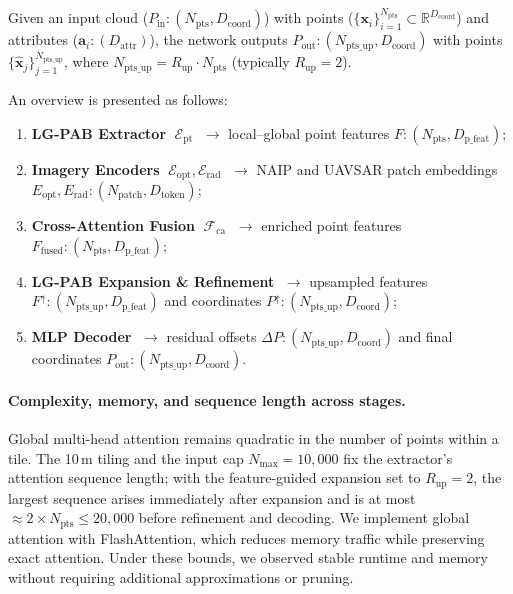 \documentclass[remotesensing,article,accept,pdftex,moreauthors]{Definitions/mdpi}
\begin{document}
Given an input cloud ($P_{\text{in}}: (N_{\text{pts}}, D_{\text{coord}})$) with points
 ($\{\mathbf{{x}}_i\}_{i=1}^{N_{\text{pts}}}\subset\mathbb{R}^{D_{\text{coord}}}$) and attributes ($\mathbf{a}_i: (D_{\text{attr}})$), the network outputs $P_{\text{out}}: (N_{\text{pts\_up}}, D_{\text{coord}})$ with points $\{\hat{\mathbf{x}}_j\}_{j=1}^{N_{\text{pts\_up}}}$, where $N_{\text{pts\_up}} = R_{\text{up}} \cdot N_{\text{pts}}$ (typically $R_{\text{up}} = 2$).

An overview is presented as follows:

\begin{enumerate}[leftmargin=*]
\item \textbf{LG-PAB Extractor
} $\;\mathcal{E}_{\mathrm{pt}}$
      $\;\rightarrow$ local–global point features $F: (N_{\text{pts}}, D_{\text{p\_feat}})$;
\item \textbf{Imagery Encoders} $\;\mathcal{E}_{\mathrm{opt}},\mathcal{E}_{\mathrm{rad}}$
      $\;\rightarrow$ NAIP and UAVSAR patch embeddings $E_{\text{opt}}, E_{\text{rad}}: (N_{\text{patch}}, D_{\text{token}})$;
\item \textbf{Cross-Attention Fusion} $\;\mathcal{F}_{\mathrm{ca}}$
      $\;\rightarrow$ enriched point features $F_{\!\mathrm{fused}}: (N_{\text{pts}}, D_{\text{p\_feat}})$;
\item \textbf{LG-PAB Expansion \& Refinement}
      $\;\rightarrow$ upsampled features $F^{\uparrow}: (N_{\text{pts\_up}}, D_{\text{p\_feat}})$ and coordinates $P^{\uparrow}: (N_{\text{pts\_up}}, D_{\text{coord}})$;
\item \textbf{MLP Decoder} $\;\rightarrow$ residual offsets $\Delta P: (N_{\text{pts\_up}}, D_{\text{coord}})$ and final coordinates $P_{\mathrm{out}}: (N_{\text{pts\_up}}, D_{\text{coord}})$.
\end{enumerate}


\paragraph{Complexity, memory, and sequence length across stages.}
Global multi-head attention remains quadratic in the number of points within a tile. The 10\,m tiling and the input cap $N_{\max}=10{,}000$ fix the extractor’s attention sequence length; with the feature-guided expansion set to $R_{\text{up}}=2$, the largest sequence arises immediately after expansion and is at most $\approx 2\times N_{\text{pts}} \le 20{,}000$ before refinement and decoding. We implement global attention with FlashAttention, which reduces memory traffic while preserving exact attention. Under these bounds, we observed stable runtime and memory without requiring additional approximations or pruning.
\end{document}
